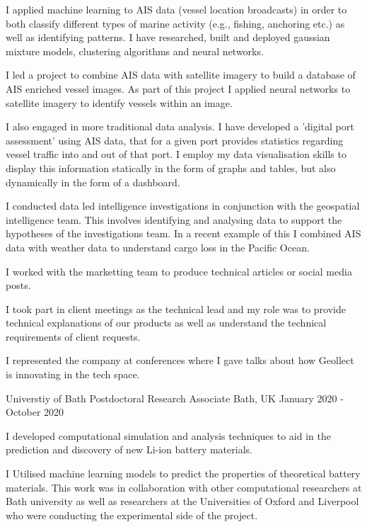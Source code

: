 \begin{cventries}
{\begin{cvitems}
        \item {I applied machine learning to AIS data (vessel location broadcasts) in order to both classify different types of marine activity (e.g., fishing, anchoring etc.) as well as identifying patterns. I have researched, built and deployed gaussian mixture models, clustering algorithms and neural networks.}
        \item {I led a project to combine AIS data with satellite imagery to build a database of AIS enriched vessel images. As part of this project I applied neural networks to satellite imagery to identify vessels within an image.}
        \item {I also engaged in more traditional data analysis. I have developed a 'digital port assessment' using AIS data, that for a given port provides statistics regarding vessel traffic into and out of that port. I employ my data visualisation skills to display this information statically in the form of graphs and tables, but also dynamically in the form of a dashboard.}
        \item {I conducted data led intelligence investigations in conjunction with the geospatial intelligence team. This involves identifying and analysing data to support the hypotheses of the investigations team. In a recent example of this I combined AIS data with weather data to understand cargo loss in the Pacific Ocean.}
        \item {I worked with the marketting team to produce technical articles or social media posts.}
        \item {I took part in client meetings as the technical lead and my role was to provide technical explanations of our products as well as understand the technical requirements of client requests.}
        \item {I represented the company at conferences where I gave talks about how Geollect is innovating in the tech space.}
      \end{cvitems}
    }
  \cventry
    {Universtiy of Bath}
    {Postdoctoral Research Associate}
    {Bath, UK}
    {January 2020 - October 2020}
    {
      \begin{cvitems}
        \item {I developed computational simulation and analysis techniques to aid in the prediction and discovery of new Li-ion battery materials.}
        \item {I Utilised machine learning models to predict the properties of theoretical battery materials. This work was in collaboration with other computational researchers at Bath university as well as researchers at the Universities of Oxford and Liverpool who were conducting the experimental side of the project.}

\end{cvitems}}
\end{cventries}
